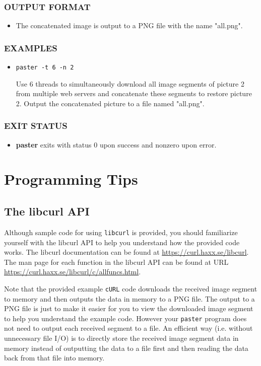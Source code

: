 \subsubsection*{OUTPUT FORMAT}
\begin{itemize}
\item[] The concatenated image is output to a PNG file with the name "all.png". 
\end{itemize}

\subsubsection*{EXAMPLES}
\begin{itemize}
\item[]
\begin{verbatim}
paster -t 6 -n 2
\end{verbatim}
Use 6 threads to simultaneously download all image segments of picture 2 from multiple web servers and concatenate these segments to restore picture 2. Output the concatenated picture to a file named "all.png". 
\end{itemize}

\subsubsection*{EXIT STATUS}
\begin{itemize}
\item[]
  {\bf paster} exits with status 0 upon success and nonzero upon error.
\end{itemize}

\section{Programming Tips}
\label{sec:code-walk-through}

\subsection{The libcurl API}
Although sample code for using \verb+libcurl+ is provided, you should familiarize yourself with the libcurl API to help you understand how the provided code works. The libcurl documentation can be found at \url{https://curl.haxx.se/libcurl}. The man page for each function in the libcurl API can be found at URL \url{https://curl.haxx.se/libcurl/c/allfuncs.html}.

Note that the provided example \verb+cURL+ code downloads the received image segment to memory and then outputs the data in memory to a PNG file. The output to a PNG file is just to make it easier for you to view the downloaded image segment to help you understand the example code. However your \verb+paster+ program does not need to output each received segment to a file. An efficient way (i.e. without unnecessary file I/O) is to directly store the received image segment data in memory instead of outputting the data to a file first and then reading the data back from that file into memory. 


